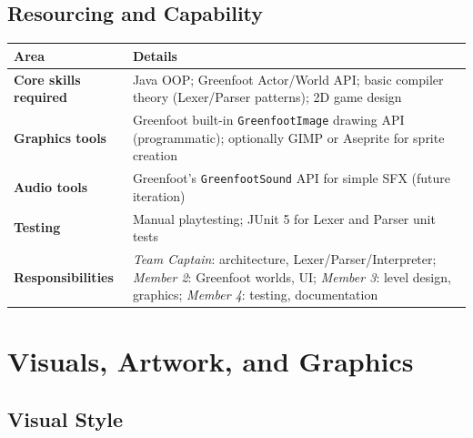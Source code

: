 \documentclass[12pt,a4paper]{article}
\begin{document}
\subsection{Resourcing and Capability}

\begin{tcolorbox}[gddbox, title={Resourcing / Capability}]
\begin{tabularx}{\linewidth}{>{\bfseries\sffamily\color{primary}}p{4cm} X}
  \toprule
  Area & Details \\
  \midrule
  \textbf{Core skills required} & Java OOP; Greenfoot Actor/World API; basic compiler theory (Lexer/Parser patterns); 2D game design \\
  \textbf{Graphics tools} & Greenfoot built-in \texttt{GreenfootImage} drawing API (programmatic); optionally GIMP or Aseprite for sprite creation \\
  \textbf{Audio tools} & Greenfoot's \texttt{GreenfootSound} API for simple SFX (future iteration) \\
  \textbf{Testing} & Manual playtesting; JUnit 5 for Lexer and Parser unit tests \\
  \textbf{Responsibilities} & \emph{Team Captain}: architecture, Lexer/Parser/Interpreter; \emph{Member 2}: Greenfoot worlds, UI; \emph{Member 3}: level design, graphics; \emph{Member 4}: testing, documentation \\
  \bottomrule
\end{tabularx}
\end{tcolorbox}

\section{Visuals, Artwork, and Graphics}

\subsection{Visual Style}
\end{document}
